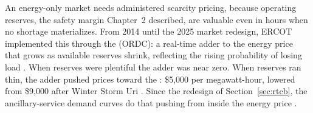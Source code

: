 An energy-only market needs administered scarcity pricing, because operating reserves, the safety margin Chapter~2 described, are valuable even in hours when no shortage materializes. From 2014 until the 2025 market redesign, ERCOT implemented this through the  (ORDC): a real-time adder to the energy price that grows as available reserves shrink, reflecting the rising probability of losing load \autocite{puct25509}. %
When reserves were plentiful the adder was near zero. When reserves ran thin, the adder pushed prices toward the : \$5,000 per megawatt-hour, lowered from \$9,000 after Winter Storm Uri \autocite{ercot2021hcapnotice,puct25509}. Since the redesign of Section~\ref{sec:rtcb}, the ancillary-service demand curves do that pushing from inside the energy price \autocite{ercot2026protocols}. %
